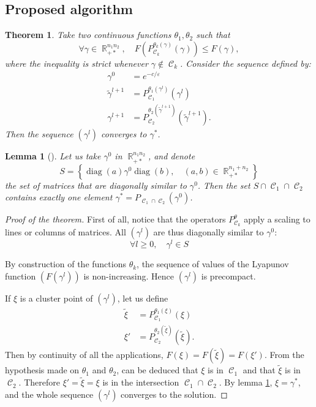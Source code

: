 \documentclass{article} %
\DeclareMathOperator{\IR}{\mathbb{R}}
\DeclareMathOperator{\Ccal}{\mathcal{C}}
\DeclareMathOperator{\diag}{diag}
\renewcommand{\epsilon}{\varepsilon}
\theoremstyle{plain}
\newtheorem{theorem}{Theorem}
\newtheorem{lemma}{Lemma}
\theoremstyle{definition}
\theoremstyle{remark}
\begin{document}
\subsection{Proposed algorithm}


\begin{theorem}\label{thm:algo}
	Take two continuous functions $\theta_1,\theta_2$ such that
	\begin{equation}\label{eq:cond_theta_k}
	\forall \gamma \in \IR_{+*}^{n_1 n_2},\quad
	F(P_{\Ccal_k}^{\theta_k(\gamma)}(\gamma)) \le F(\gamma) ,
	\end{equation}
	where the inequality is strict whenever $\gamma \notin \Ccal_k$.
	Consider the sequence defined by:
	\begin{align*}
	\gamma^0 &= e^{-c/\epsilon} \\
	\tilde{\gamma}^{l+1} &= P_{\Ccal_1}^{\theta_1(\gamma^l)}(\gamma^l) \\
	\gamma^{l+1} &= P_{\Ccal_2}^{\theta_2(\tilde{\gamma}^{l+1})}(\tilde{\gamma}^{l+1}).
	\end{align*}
	Then the sequence $(\gamma^l)$ converges to $\gamma^*$.
\end{theorem}


\begin{lemma}[\cite{cuturi13}]
	\label{lemma:trivial_intersection}
	Let us take $\gamma^0$ in $\IR_{+*}^{n_1 n_2}$,
	and denote
	\[
	S = \left\{
	\diag(a) \gamma^0 \diag(b),\quad
	(a,b) \in \IR_{+*}^{n_1 + n_2}
	\right\}
	\]
	the set of matrices that are diagonally similar to $\gamma^0$.
	Then the set $S \cap \Ccal_1 \cap \Ccal_2$ contains exactly one element $\gamma^* = P_{\Ccal_1 \cap \Ccal_2}(\gamma^0)$.
\end{lemma}


\begin{proof}[Proof of the theorem]
	First of all, notice that the operators $P_{\Ccal_k}^\theta$ apply a scaling to lines or columns of matrices. All $(\gamma^l)$ are thus diagonally similar to $\gamma^0$:
	\[
	\forall l\ge0,\quad \gamma^l \in S
	\]
	
	By construction of the functions $\theta_k$, the sequence of values of the Lyapunov function $(F(\gamma^l))$ is non-increasing. Hence $(\gamma^l)$ is precompact.
	
	If $\xi$ is a cluster point of $(\gamma^l)$, let us define
	\begin{align*}
	\tilde{\xi} &= P_{\Ccal_1}^{\theta_1(\xi)}(\xi) \\
	\xi' &= P_{\Ccal_2}^{\theta_2(\tilde{\xi})}(\tilde{\xi}).
	\end{align*}
	Then by continuity of all the applications, $F(\xi) = F(\tilde{\xi}) = F(\xi')$.
	From the hypothesis made on $\theta_1$ and $\theta_2$, can be deduced that $\xi$ is in $\Ccal_1$ and that $\tilde{\xi}$ is in $\Ccal_2$. Therefore $\xi' = \tilde{\xi} = \xi$ is in the intersection $\Ccal_1 \cap \Ccal_2$.
	By lemma \ref{lemma:trivial_intersection}, $\xi = \gamma^*$, and the whole sequence $(\gamma^l)$ converges to the solution.
\end{proof}
\end{document}
